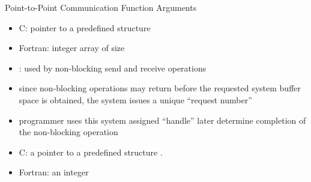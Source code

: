\documentclass[9pt,c]{beamer}
\begin{document}
\begin{frame}{Point-to-Point Communication Function Arguments}
\begin{itemize}
    \item[] C: pointer to a predefined structure 
    \item[] Fortran: integer array of size 
    \item {}: used by non-blocking send and receive operations
    \item[] since non-blocking operations may return before the requested system buffer space is obtained, the system issues a unique “request number”
    \item[] programmer uses this system assigned “handle” later determine completion of the non-blocking operation
    \item[] C: a pointer to a predefined structure .
    \item[] Fortran: an integer
  \end{itemize}
\end{frame}
\end{document}
